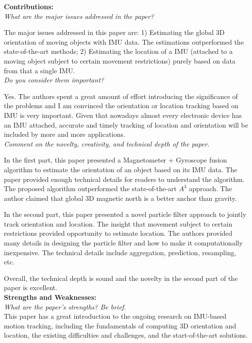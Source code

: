 \documentclass[11pt, oneside]{article}   	%
\begin{document}
\noindent \textbf{Contributions:}\\
\emph{What are the major issues addressed in the paper?}

The major issues addressed in this paper are: 1) Estimating the global 3D orientation of moving objects with IMU data. The estimations outperformed the state-of-the-art methods; 2) Estimating the location of a IMU (attached to a moving object subject to certain movement restrictions) purely based on data from  that a single IMU.\\

\noindent \emph{Do you consider them important?}

Yes. The authors spent a great amount of effort introducing the significance of the problems and I am convinced the orientation or location tracking based on IMU is very important. Given that nowadays almost every electronic device has an IMU attached, accurate and timely tracking of location and orientation will be included by more and more applications.\\

\noindent \emph{Comment on the novelty, creativity, and technical depth of the paper.}

In the first part, this paper presented a Magnetometer + Gyroscope fusion algorithm to estimate the orientation of an object based on its IMU data. The paper provided enough technical details for readers to understand the algorithm. The proposed algorithm outperformed the state-of-the-art $A^3$ approach. The author claimed that global 3D magnetic north is a better anchor than gravity.

In the second part, this paper presented a novel particle filter approach to jointly track orientation and location. The insight that movement subject to certain restrictions provided opportunity to estimate location. The authors provided many details in designing the particle filter and how to make it computationally inexpensive. The technical details include aggregation, prediction, resampling, etc.

Overall, the technical depth is sound and the novelty in the second part of the paper is excellent.\\

\noindent \textbf{Strengths and Weaknesses:}\\
\emph{What are the paper’s strengths? Be brief.}\\

This paper has a great introduction to the ongoing research on IMU-based motion tracking, including the fundamentals of computing 3D orientation and location, the existing difficulties and challenges, and the start-of-the-art solutions. 
\end{document}
